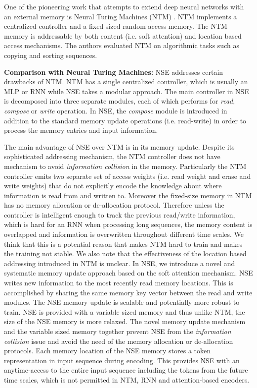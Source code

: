 \documentclass{article}
\begin{document}
One of the pioneering work that attempts to extend deep neural networks with an external memory is Neural Turing Machines (NTM) \cite{graves2014neural}. NTM implements a centralized controller and a fixed-sized random access memory. The NTM memory is addressable by both content (i.e. soft attention) and location based access mechanisms. The authors evaluated NTM on algorithmic tasks such as copying and sorting sequences.

\textbf{Comparison with Neural Turing Machines:} NSE addresses certain drawbacks of NTM. NTM has a single centralized controller, which is usually an MLP or RNN while NSE takes a modular approach. The main controller in NSE is decomposed into three separate modules, each of which performs for \textit{read}, \textit{compose} or \textit{write} operation. In NSE, the \textit{compose} module is introduced in addition to the standard memory update operations (i.e. read-write) in order to process the memory entries and input information.

The main advantage of NSE over NTM is in its memory update. Despite its sophisticated addressing mechanism, the NTM controller does not have mechanism to avoid \textit{information collision} in the memory. Particularly the NTM controller emits two separate set of access weights (i.e. read weight and erase and write weights) that do not explicitly encode the knowledge about where information is read from and written to. Moreover the fixed-size memory in NTM has no memory allocation or de-allocation protocol. Therefore unless the controller is intelligent enough to track the previous read/write information, which is hard for an RNN when processing long sequences, the memory content is overlapped and information is overwritten throughout different time scales. We think that this is a potential reason that makes NTM hard to train and makes the training not stable. We also note that the effectiveness of the location based addressing introduced in NTM is unclear. 
In NSE, we introduce a novel and systematic memory update approach based on the soft attention mechanism. NSE writes new information to the most recently read memory locations. This is accomplished by sharing the same memory key vector between the read and write modules. The NSE memory update is scalable and potentially more robust to train. NSE is provided with a variable sized memory and thus unlike NTM, the size of the NSE memory is more relaxed. The novel memory update mechanism and the variable sized memory together prevent NSE from the \textit{information collision} issue and avoid the need of the memory allocation or de-allocation protocols.
Each memory location of the NSE memory stores a token representation in input sequence during encoding. This provides NSE with an anytime-access to the entire input sequence including the tokens from the future time scales, which is not permitted in NTM, RNN and attention-based encoders.
\end{document}
